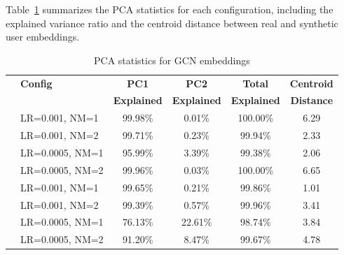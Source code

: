 Table~\ref{tab:pca_stats} summarizes the PCA statistics for each configuration, including the explained variance ratio and the centroid distance between real and synthetic user embeddings.

\begin{table}[h]
	\centering
	\caption{PCA statistics for GCN embeddings}
	\label{tab:pca_stats}
	\small
	\begin{tabular}{llcccc}
		\toprule
		 & \textbf{Config} & \textbf{PC1}       & \textbf{PC2}       & \textbf{Total}     & \textbf{Centroid} \\
		 &                 & \textbf{Explained} & \textbf{Explained} & \textbf{Explained} & \textbf{Distance} \\
		\midrule
		\multirow{4}{*}{\rotatebox{90}{\textcolor{drawred}{\textbf{Orig.}}}}
		 & LR=0.001, NM=1  & 99.98\%            & 0.01\%             & 100.00\%           & 6.29              \\
		 & LR=0.001, NM=2  & 99.71\%            & 0.23\%             & 99.94\%            & 2.33              \\
		 & LR=0.0005, NM=1 & 95.99\%            & 3.39\%             & 99.38\%            & 2.06              \\
		 & LR=0.0005, NM=2 & 99.96\%            & 0.03\%             & 100.00\%           & 6.65              \\
		\midrule
		\multirow{4}{*}{\rotatebox{90}{\textcolor{drawblue}{\textbf{Incr.}}}}
		 & LR=0.001, NM=1  & 99.65\%            & 0.21\%             & 99.86\%            & 1.01              \\
		 & LR=0.001, NM=2  & 99.39\%            & 0.57\%             & 99.96\%            & 3.41              \\
		 & LR=0.0005, NM=1 & 76.13\%            & 22.61\%            & 98.74\%            & 3.84              \\
		 & LR=0.0005, NM=2 & 91.20\%            & 8.47\%             & 99.67\%            & 4.78              \\
		\bottomrule
	\end{tabular}
\end{table}



